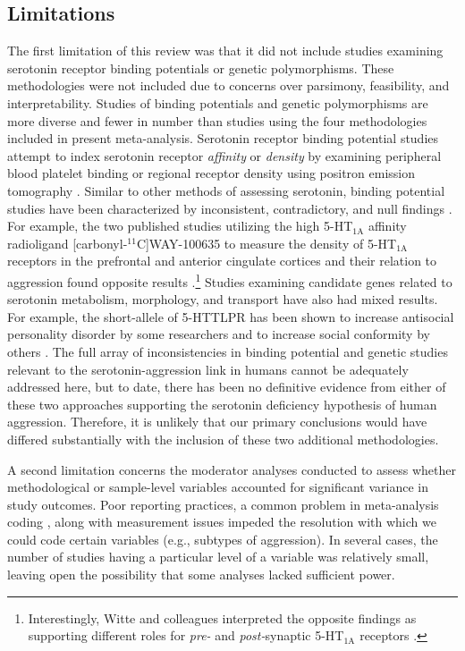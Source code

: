 \subsection{Limitations}
The first limitation of this review was that it did not include studies examining serotonin receptor binding potentials or genetic polymorphisms. These methodologies were not included due to concerns over parsimony, feasibility, and interpretability. Studies of binding potentials and genetic polymorphisms are more diverse and fewer in number than studies using the four methodologies included in present meta-analysis. Serotonin receptor binding potential studies attempt to index serotonin receptor \emph{affinity} or \emph{density} by examining peripheral blood platelet binding \parencite[e.g.,][]{Coccaro1996} or regional receptor density using positron emission tomography \parencite{Witte2009}. Similar to other methods of assessing serotonin, binding potential studies have been characterized by inconsistent, contradictory, and null findings \parencite[e.g.,][]{Castrogiovanni1994, Maguire1997, Marazziti1991}. For example, the two published studies utilizing the high 5-HT$_{\textrm{1A}}$ affinity radioligand [carbonyl-$^{11}$C]WAY-100635 to measure the density of 5-HT$_{\textrm{1A}}$ receptors in the prefrontal and anterior cingulate cortices and their relation to aggression found opposite results \parencite{Parsey2002, Witte2009}.\footnote{Interestingly, Witte and colleagues interpreted the opposite findings as supporting different roles for \emph{pre-} and \emph{post-}synaptic 5-HT$_{\textrm{1A}}$ receptors \parencite{Witte2009}.} Studies examining candidate genes related to serotonin metabolism, morphology, and transport \parencite[see][]{Gunter2010} have also had mixed results. For example, the short-allele of 5-HTTLPR has been shown to increase antisocial personality disorder by some researchers \parencite{Douglas2011} and to increase social conformity by others \parencite{Homberg2011}. The full array of inconsistencies in binding potential and genetic studies relevant to the serotonin-aggression link in humans cannot be adequately addressed here, but to date, there has been no definitive evidence from either of these two approaches supporting the serotonin deficiency hypothesis of human aggression. Therefore, it is unlikely that our primary conclusions would have differed substantially with the inclusion of these two additional methodologies.


A second limitation concerns the moderator analyses conducted to assess whether methodological or sample-level variables accounted for significant variance in study outcomes. Poor reporting practices, a common problem in meta-analysis coding \parencite[e.g.,][]{Cox1995c, Lipsey01}, along with measurement issues impeded the resolution with which we could code certain variables (e.g., subtypes of aggression). In several cases, the number of studies having a particular level of a variable was relatively small, leaving open the possibility that some analyses lacked sufficient power. 


